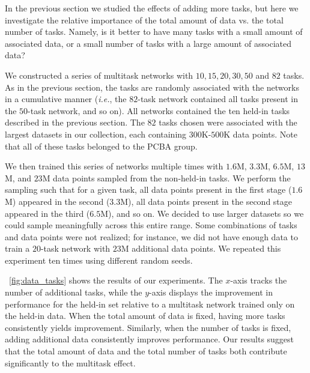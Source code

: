 In the previous section we studied the effects of adding more tasks, but
here we investigate the relative importance of the total amount of data vs.
the total number of tasks. Namely, is it better to have many tasks with a
small amount of associated data, or a small number of tasks with a large
amount of associated data?

We constructed a series of multitask networks with $10, 15, 20, 30, 50$ and
$82$ tasks. As in the previous section, the tasks are randomly associated
with the networks in a cumulative manner (\emph{i.e.}, the $82$-task
network contained all tasks present in the $50$-task network, and so on).
All networks contained the ten held-in tasks described in the previous
section. The $82$ tasks chosen were associated with the largest datasets in
our collection, each containing $300$K-$500$K data points. Note that all of
these tasks belonged to the PCBA group.

We then trained this series of networks multiple times with $1.6$M, $3.3$M,
$6.5$M, $13$M, and $23$M data points sampled from the non-held-in tasks. We
perform the sampling such that for a given task, all data points present in
the first stage ($1.6$M) appeared in the second ($3.3$M), all data points
present in the second stage appeared in the third ($6.5$M), and so on. We
decided to use larger datasets so we could sample meaningfully across this
entire range. Some combinations of tasks and data points were not realized;
for instance, we did not have enough data to train a $20$-task network with
$23$M additional data points. We repeated this experiment ten times using
different random seeds.

\figurename~\ref{fig:data_tasks} shows the results of our experiments. The
$x$-axis tracks the number of additional tasks, while the $y$-axis displays
the improvement in performance for the held-in set relative to a multitask
network trained only on the held-in data. When the total amount of data is
fixed, having more tasks consistently yields improvement. Similarly, when
the number of tasks is fixed, adding additional data consistently improves
performance. Our results suggest that the total amount of data and the
total number of tasks both contribute significantly to the multitask
effect.

